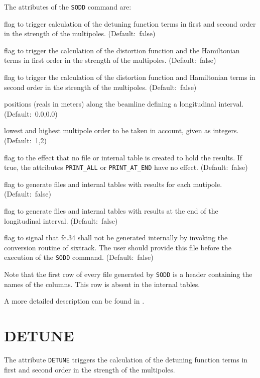 The attributes of the \texttt{SODD} command are:
\begin{madlist}
   flag to trigger calculation of the detuning function
  terms in first and second order in the strength of the
  multipoles. (Default:~false) 

   flag to trigger the calculation of the distortion
  function and the Hamiltonian terms in first order in the strength of
  the multipoles. (Default:~false)  

   flag to trigger the calculation of the distortion
  function and Hamiltonian terms in second order in the strength of the
  multipoles. (Default:~false) 

   positions (reals in meters) along the beamline
  defining a longitudinal interval. (Default:~0.0,0.0)

   lowest and highest multipole
  order to be taken in account, given as integers. (Default:~1,2)  

   flag to the effect that no file or internal
  table is created to hold the results. If true, the
  attributes \texttt{PRINT\_ALL} or \texttt{PRINT\_AT\_END} have no
  effect. (Default:~false) 

   flag to generate files and internal tables with
  results for each mutipole. (Default:~false)

   flag to generate files and internal tables with
  results at the end of the longitudinal interval. (Default:~false)

   flag to signal that fc.34 shall not be generated
  internally by invoking the conversion routine of sixtrack. The user
  should provide this file before the execution of the \texttt{SODD}
  command. (Default:~false)  

\end{madlist}

Note that the first row of every file generated by \texttt{SODD} is a
header containing the names of the columns. This row is absent in the
internal tables.

A more detailed description can be found in \cite{damico2004}.
 
\section{DETUNE} 

The attribute \texttt{DETUNE} triggers the calculation of the detuning
function terms in first and second order in the strength of the
multipoles.  

